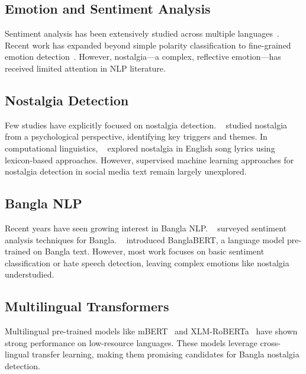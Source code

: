 \documentclass[conference]{IEEEtran}
\begin{document}
\subsection{Emotion and Sentiment Analysis}

Sentiment analysis has been extensively studied across multiple languages~\cite{pang2008opinion,liu2012sentiment}. Recent work has expanded beyond simple polarity classification to fine-grained emotion detection~\cite{mohammad2018emotions}. However, nostalgia—a complex, reflective emotion—has received limited attention in NLP literature.

\subsection{Nostalgia Detection}

Few studies have explicitly focused on nostalgia detection. \citeauthor{zhou2012nostalgia}~\cite{zhou2012nostalgia} studied nostalgia from a psychological perspective, identifying key triggers and themes. In computational linguistics, \citeauthor{abdul2017nostalgia}~\cite{abdul2017nostalgia} explored nostalgia in English song lyrics using lexicon-based approaches. However, supervised machine learning approaches for nostalgia detection in social media text remain largely unexplored.

\subsection{Bangla NLP}

Recent years have seen growing interest in Bangla NLP. \citeauthor{hasan2020bangla}~\cite{hasan2020bangla} surveyed sentiment analysis techniques for Bangla. \citeauthor{alam2021banglabert}~\cite{alam2021banglabert} introduced BanglaBERT, a language model pre-trained on Bangla text. However, most work focuses on basic sentiment classification or hate speech detection, leaving complex emotions like nostalgia understudied.

\subsection{Multilingual Transformers}

Multilingual pre-trained models like mBERT~\cite{devlin2019bert} and XLM-RoBERTa~\cite{conneau2020xlmr} have shown strong performance on low-resource languages. These models leverage cross-lingual transfer learning, making them promising candidates for Bangla nostalgia detection.
\end{document}
